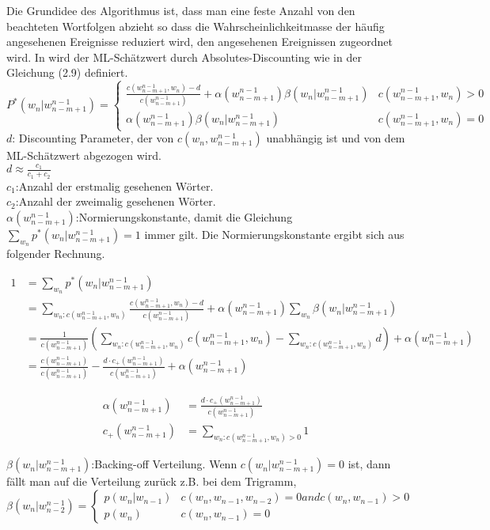 Die Grundidee des Algorithmus ist, dass man eine feste Anzahl von den beachteten Wortfolgen abzieht so dass die Wahrscheinlichkeitmasse der h\"aufig angesehenen Ereignisse reduziert wird, den angesehenen Ereignissen zugeordnet wird. In \cite{ars_script} wird der ML-Sch\"atzwert durch Absolutes-Discounting wie in der Gleichung (2.9) definiert.
\begin{equation}
P^{*}(w_{n}|w_{n-m+1}^{n-1})=\begin{cases}
\frac{c(w_{n-m+1}^{n-1},w_{n})-d}{c(w_{n-m+1}^{n-1})}+\alpha (w_{n-m+1}^{n-1})\beta (w_{n}|w_{n-m+1}^{n-1}) & c(w_{n-m+1}^{n-1},w_{n})>0 \\
\alpha (w_{n-m+1}^{n-1})\beta (w_{n}|w_{n-m+1}^{n-1}) & c(w_{n-m+1}^{n-1},w_{n})=0 
\end{cases}
\end{equation}
$d$: Discounting Parameter, der von $c(w_{n},w_{n-m+1}^{n-1})$ unabh\"angig ist und von dem ML-Sch\"atzwert abgezogen wird.\\
$d\approx \frac{c_{1}}{c_{1}+c_{2}}$ \\
$c_{1}$:Anzahl der erstmalig gesehenen W\"orter.\\
$c_{2}$:Anzahl der zweimalig gesehenen W\"orter.\\
$\alpha (w_{n-m+1}^{n-1})$:Normierungskonstante, damit die Gleichung $\sum_{w_{n}}p^{*}(w_{n}|w_{n-m+1}^{n-1})=1$ immer gilt. Die Normierungskonstante ergibt sich aus folgender Rechnung.

\begin{align}
1 &=\sum_{w_{n}}p^{*}(w_{n}|w_{n-m+1}^{n-1})\nonumber\\
&=\sum_{w_{n}:c(w_{n-m+1}^{n-1},w_{n})}\frac{c(w_{n-m+1}^{n-1},w_{n})-d}{c(w_{n-m+1}^{n-1})}+\alpha(w_{n-m+1}^{n-1})\sum_{w_{n}}\beta (w_{n}|w_{n-m+1}^{n-1}) \nonumber\\
&=\frac{1}{c(w_{n-m+1}^{n-1})}(\sum_{w_{n}:c(w_{n-m+1}^{n-1},w_{n})}c(w_{n-m+1}^{n-1},w_{n})-\sum_{w_{n}:c(w_{n-m+1}^{n-1},w_{n})}d)+\alpha (w_{n-m+1}^{n-1}) \nonumber\\
&=\frac{c(w_{n-m+1}^{n-1})}{c(w_{n-m+1}^{n-1})}-\frac{d\cdot c_{+}(w_{n-m+1}^{n-1})}{c(w_{n-m+1}^{n-1})}+\alpha (w_{n-m+1}^{n-1})
\end{align}

\begin{align}
\alpha (w_{n-m+1}^{n-1}) &=\frac{d\cdot c_{+}(w_{n-m+1}^{n-1})}{c(w_{n-m+1}^{n-1})}\\
c_{+}(w_{n-m+1}^{n-1}) &=\sum_{w_{n}:c(w_{n-m+1}^{n-1},w_{n})>0}1
\end{align}


$\beta (w_{n}|w_{n-m+1}^{n-1})$:Backing-off Verteilung. Wenn $c(w_{n}|w_{n-m+1}^{n-1})=0$ ist, dann f\"allt man auf die Verteilung zur\"uck
z.B. bei dem Trigramm,\\

\begin{equation}
\beta (w_{n}|w_{n-2}^{n-1})=\begin{cases}
p(w_{n}|w_{n-1}) & c(w_{n},w_{n-1},w_{n-2})=0 and c(w_{n},w_{n-1})>0 \\
p(w_{n}) & c(w_{n},w_{n-1})=0 
\end{cases}
\end{equation}

